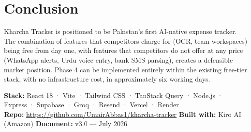 \documentclass[11pt,a4paper]{article}
\begin{document}
\section*{Conclusion}

Kharcha Tracker is positioned to be Pakistan's first AI-native expense tracker.
The combination of features that competitors charge for (OCR, team workspaces)
being free from day one, with features that competitors do not offer at any price
(WhatsApp alerts, Urdu voice entry, bank SMS parsing), creates a defensible
market position. Phase 4 can be implemented entirely within the existing
free-tier stack, with no infrastructure cost, in approximately six working days.

\vspace{8pt}
\noindent{\color{royal}\rule{\linewidth}{1pt}}
\small
\noindent \textbf{Stack:} React 18 · Vite · Tailwind CSS · TanStack Query · Node.js · Express · Supabase · Groq · Resend · Vercel · Render \\
\textbf{Repo:} \url{https://github.com/UmairAbbas1/kharcha-tracker} \quad
\textbf{Built with:} Kiro AI (Amazon) \quad
\textbf{Document:} v3.0 — July 2026
\end{document}
